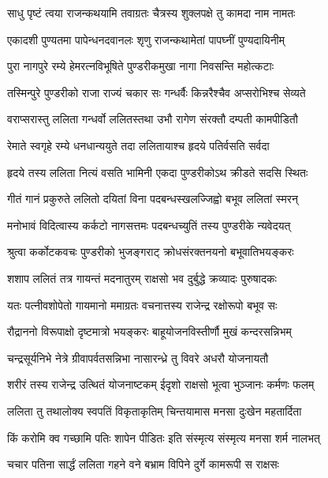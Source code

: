 
\twolineshloka
{साधु पृष्टं त्वया राजन्कथयामि तवाग्रतः}
{चैत्रस्य शुक्लपक्षे तु कामदा नाम नामतः}%

\twolineshloka
{एकादशी पुण्यतमा पापेन्धनदवानलः}
{शृणु राजन्कथामेतां पापघ्नीं पुण्यदायिनीम्}%

\twolineshloka
{पुरा नागपुरे रम्ये हेमरत्नविभूषिते}
{पुण्डरीकमुखा नागा निवसन्ति महोत्कटाः}%

\twolineshloka
{तस्मिन्पुरे पुण्डरीको राजा राज्यं चकार सः}
{गन्धर्वैः किन्नरैश्चैव अप्सरोभिश्च सेव्यते}%

\twolineshloka
{वराप्सरास्तु ललिता गन्धर्वो ललितस्तथा}
{उभौ रागेण संरक्तौ दम्पती कामपीडितौ}%

\twolineshloka
{रेमाते स्वगृहे रम्ये धनधान्ययुते तदा}
{ललितायाश्च हृदये पतिर्वसति सर्वदा}%

\twolineshloka
{हृदये तस्य ललिता नित्यं वसति भामिनी}
{एकदा पुण्डरीकोऽथ क्रीडते सदसि स्थितः}%

\twolineshloka
{गीतं गानं प्रकुरुते ललितो दयितां विना}
{पदबन्धस्खलज्जिह्वो बभूव ललितां स्मरन्}%

\twolineshloka
{मनोभावं विदित्वास्य कर्कटो नागसत्तमः}
{पदबन्धच्युतिं तस्य पुण्डरीके न्यवेदयत्}%

\twolineshloka
{श्रुत्वा कर्कोटकवचः पुण्डरीको भुजङ्गराट्}
{क्रोधसंरक्तनयनो बभूवातिभयङ्करः}%

\twolineshloka
{शशाप ललितं तत्र गायन्तं मदनातुरम्}
{राक्षसो भव दुर्बुद्धे क्रव्यादः पुरुषादकः}%

\twolineshloka
{यतः पत्नीवशोपेतो गायमानो ममाग्रतः}
{वचनात्तस्य राजेन्द्र रक्षोरूपो बभूव सः}%

\twolineshloka
{रौद्राननो विरूपाक्षो दृष्टमात्रो भयङ्करः}
{बाहूयोजनविस्तीर्णौ मुखं कन्दरसन्निभम्}%

\twolineshloka
{चन्द्रसूर्यनिभे नेत्रे ग्रीवापर्वतसन्निभा}
{नासारन्ध्रे तु विवरे अधरौ योजनायतौ}%

\twolineshloka
{शरीरं तस्य राजेन्द्र उत्थितं योजनाष्टकम्}
{ईदृशो राक्षसो भूत्वा भुञ्जानः कर्मणः फलम्}%

\twolineshloka
{ललिता तु तथालोक्य स्वपतिं विकृताकृतिम्}
{चिन्तयामास मनसा दुःखेन महतार्दिता}%

\twolineshloka
{किं करोमि क्व गच्छामि पतिः शापेन पीडितः}
{इति संस्मृत्य संस्मृत्य मनसा शर्म नालभत्}%

\twolineshloka
{चचार पतिना सार्द्धं ललिता गहने वने}
{बभ्राम विपिने दुर्गे कामरूपी स राक्षसः}%

